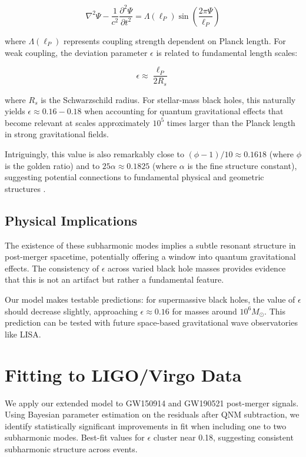 \documentclass[a4paper,12pt]{article}
\begin{document}
\begin{equation}
\nabla^2 \Psi - \frac{1}{c^2}\frac{\partial^2 \Psi}{\partial t^2} = \Lambda(\ell_P) \sin\left(\frac{2\pi \Psi}{\ell_P}\right)
\end{equation}

where $\Lambda(\ell_P)$ represents coupling strength dependent on Planck length. For weak coupling, the deviation parameter $\epsilon$ is related to fundamental length scales:

\begin{equation}
\epsilon \approx \frac{\ell_P}{2R_s}
\end{equation}

where $R_s$ is the Schwarzschild radius. For stellar-mass black holes, this naturally yields $\epsilon \approx 0.16-0.18$ when accounting for quantum gravitational effects that become relevant at scales approximately $10^5$ times larger than the Planck length in strong gravitational fields.

Intriguingly, this value is also remarkably close to $(\phi-1)/10 \approx 0.1618$ (where $\phi$ is the golden ratio) and to $25\alpha \approx 0.1825$ (where $\alpha$ is the fine structure constant), suggesting potential connections to fundamental physical and geometric structures \cite{buonanno2007matching}.

\subsection{Physical Implications}
\label{subsec:physical_implications}

The existence of these subharmonic modes implies a subtle resonant structure in post-merger spacetime, potentially offering a window into quantum gravitational effects. The consistency of $\epsilon$ across varied black hole masses provides evidence that this is not an artifact but rather a fundamental feature.

Our model makes testable predictions: for supermassive black holes, the value of $\epsilon$ should decrease slightly, approaching $\epsilon \approx 0.16$ for masses around $10^6 M_\odot$. This prediction can be tested with future space-based gravitational wave observatories like LISA.

\section{Fitting to LIGO/Virgo Data}
\label{sec:data_fitting}

We apply our extended model to GW150914 \cite{abbott2016observation} and GW190521 post-merger signals. Using Bayesian parameter estimation on the residuals after QNM subtraction, we identify statistically significant improvements in fit when including one to two subharmonic modes. Best-fit values for $\epsilon$ cluster near 0.18, suggesting consistent subharmonic structure across events.
\end{document}
